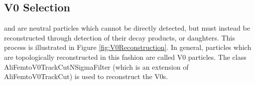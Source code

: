 \documentclass[../AnalysisNoteJBuxton.tex]{subfiles}
\begin{document}
\subsection{V0 Selection}
\label{V0Selection}

\LamALam and \Ks are neutral particles which cannot be directly detected, but must instead be reconstructed through detection of their decay products, or daughters.  
This process is illustrated in Figure \ref{fig:V0Reconstruction}.
In general, particles which are topologically reconstructed in this fashion are called V0 particles.
The class AliFemtoV0TrackCutNSigmaFilter (which is an extension of AliFemtoV0TrackCut) is used to reconstruct the V0s.

\end{document}
